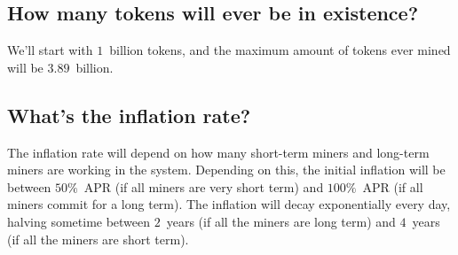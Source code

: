 \documentclass[longbibliography,nofootinbib,twocolumn]{revtex4-1}
\begin{document}
\subsection{How many tokens will ever be in existence?}
We'll start with $1$~billion tokens, and the maximum amount of tokens ever mined will be $3.89$~billion.

\subsection{What's the inflation rate?}
The inflation rate will depend on how many short-term miners and long-term miners are working in the system.
Depending on this, the initial inflation will be between $50\%$~APR (if all miners are very short term) and $100\%$~APR (if all miners commit for a long
term).
The inflation will decay exponentially every day, halving sometime between $2$~years (if all the miners are long term)
and $4$~years (if all the miners are short term).


\end{document}
